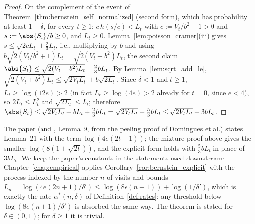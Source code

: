 \begin{proof}
\leanok
On the complement of the event of Theorem~\ref{thm:bernstein_self_normalized} (second form), which
has probability at least $1 - \delta$, for every $t \ge 1$: $c\, h(s/c) < L_t$ with
$c := V_t/b^2 + 1 > 0$ and $s := \abs{S_t}/b \ge 0$, and $L_t \ge 0$. Lemma~\ref{lem:poisson_cramer}(iii)
gives $s \le \sqrt{2cL_t} + \frac23 L_t$, i.e., multiplying by $b$ and using
$b\sqrt{2(V_t/b^2 + 1)L_t} = \sqrt{2(V_t + b^2)L_t}$, the second claim
$\abs{S_t} \le \sqrt{2(V_t + b^2)L_t} + \frac23 bL_t$. By Lemma~\ref{lem:sqrt_add_le},
$\sqrt{2(V_t + b^2)L_t} \le \sqrt{2V_tL_t} + b\sqrt{2L_t}$. Since $\delta < 1$ and $t \ge 1$,
$L_t \ge \log(12e) > 2$ (in fact $L_t \ge \log(4e) > 2$ already for $t = 0$, since $e < 4$), so
$2L_t \le L_t^2$ and $\sqrt{2L_t} \le L_t$; therefore
$\abs{S_t} \le \sqrt{2V_tL_t} + bL_t + \frac23 bL_t = \sqrt{2V_tL_t} + \frac53 bL_t \le \sqrt{2V_tL_t} + 3bL_t$.
\end{proof}

\begin{remark}[Constants]\label{rem:pconc_bernstein_constants}
The paper (and \cite{menard2021fast}, Lemma~9, from the peeling proof of Domingues et al.)
states Lemma~21 with the term $\log(4e(2t + 1))$; the mixture proof above gives the smaller
$\log(8(1 + \sqrt{2t}))$, and the explicit form holds with $\frac53 b L_t$ in place of $3bL_t$. We
keep the paper's constants in the statements used downstream: Chapter~\ref{chap:empirical}
applies Corollary~\ref{cor:bernstein_explicit} with the process indexed by the number $n$ of
visits and bounds $L_n = \log(4e(2n + 1)/\delta') \le \log(8e(n + 1)) + \log(1/\delta')$, which
is exactly the rate $\alpha^*(n, \delta)$ of Definition~\ref{def:rates}; any threshold below
$\log(8e(n + 1)/\delta')$ is absorbed the same way. The theorem is stated for $\delta \in (0, 1)$;
for $\delta \ge 1$ it is trivial.
\end{remark}

